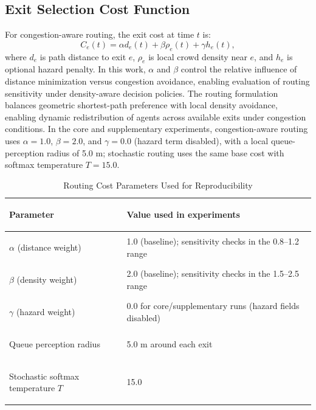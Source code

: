 \documentclass[utf8]{FrontiersinHarvard}
\begin{document}
\subsection{Exit Selection Cost Function}
For congestion-aware routing, the exit cost at time $t$ is:
\begin{equation}
    C_e(t)=\alpha d_e(t)+\beta \rho_e(t)+\gamma h_e(t),
    \label{eq:cost}
\end{equation}
where $d_e$ is path distance to exit $e$, $\rho_e$ is local crowd density near $e$, and $h_e$ is optional hazard penalty. In this work, $\alpha$ and $\beta$ control the relative influence of distance minimization versus congestion avoidance, enabling evaluation of routing sensitivity under density-aware decision policies. The routing formulation balances geometric shortest-path preference with local density avoidance, enabling dynamic redistribution of agents across available exits under congestion conditions. In the core and supplementary experiments, congestion-aware routing uses $\alpha=1.0$, $\beta=2.0$, and $\gamma=0.0$ (hazard term disabled), with a local queue-perception radius of 5.0 m; stochastic routing uses the same base cost with softmax temperature $T=15.0$.

\begin{table}[t]
\centering
\caption{Routing Cost Parameters Used for Reproducibility}
\label{tab:routing_params}
{\footnotesize
\setlength{\tabcolsep}{4pt}
\renewcommand{\arraystretch}{1.05}
\begin{tabular}{>{\bfseries\raggedright\arraybackslash}L{3.20cm} L{7.40cm}}
\toprule
Parameter & Value used in experiments \\
\midrule
$\alpha$ (distance weight) & 1.0 (baseline); sensitivity checks in the 0.8--1.2 range \\
$\beta$ (density weight) & 2.0 (baseline); sensitivity checks in the 1.5--2.5 range \\
$\gamma$ (hazard weight) & 0.0 for core/supplementary runs (hazard fields disabled) \\
Queue perception radius & 5.0 m around each exit \\
Stochastic softmax temperature $T$ & 15.0 \\
\bottomrule
\end{tabular}
}
\end{table}
\end{document}
